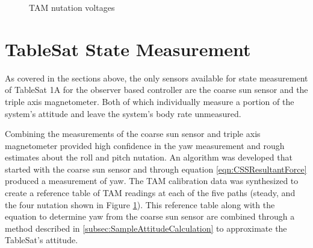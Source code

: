 \begin{figure}[H]
  \centerline{}
  \caption{TAM nutation voltages}
  \label{fig:TAMNutationVoltages}
\end{figure}

\section{TableSat State Measurement}
\label{subsec:StateMeasurement}

As covered in the sections above, the only sensors available for state measurement of TableSat 1A for the observer based controller are the coarse sun sensor and the triple axis magnetometer.  Both of which individually measure a portion of the system's attitude and leave the system's body rate unmeasured.

Combining the measurements of the coarse sun sensor and triple axis magnetometer provided high confidence in the yaw measurement and rough estimates about the roll and pitch nutation.  An algorithm was developed that started with the coarse sun sensor and through equation \ref{eqn:CSSResultantForce} produced a measurement of yaw.  The TAM calibration data was synthesized to create a reference table of TAM readings at each of the five paths (steady, and the four nutation shown in Figure \ref{fig:TAMNutationVoltages}).  This reference table along with the equation to determine yaw from the coarse sun sensor are combined through a method described in \ref{subsec:SampleAttitudeCalculation} to approximate the TableSat's attitude.

